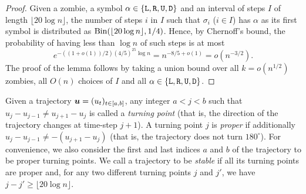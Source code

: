 \documentclass[12pt]{amsart}
\begin{document}
\begin{proof}
Given a zombie, a symbol $\alpha\in\{{\mathtt L},{\mathtt R},{\mathtt U},{\mathtt D}\}$ and an interval of steps $I$ of length $\lfloor 20\log n \rfloor$, the number of steps $i$  in $I$ such that $\sigma_i$ ($i\in I$) has $\alpha$ as its first
symbol is distributed as $\mathrm{Bin}(\lfloor 20\log n \rfloor,1/4)$. Hence, by Chernoff's bound, the probability of having less than $\log n$ of such steps is at most
\[
e^{-((1+o(1))/2)(4/5)^25\log n} = n^{-8/5+o(1)} = o(n^{-3/2}).
\]
The proof of the lemma follows by taking a union bound over all $k=o(n^{1/2})$ zombies, all $O(n)$ choices of $I$ and all $\alpha\in\{{\mathtt L},{\mathtt R},{\mathtt U},{\mathtt D}\}$.
\end{proof}
Given a trajectory ${\boldsymbol u}=(u_t)_{t\in[a,b]}$, any integer $a<j<b$ such that $u_j-u_{j-1} \ne u_{j+1}-u_j$ is called a \emph{turning point} (that is, the direction of the trajectory changes at time-step
$j+1$). A turning point $j$ is \emph{proper} if additionally $u_j-u_{j-1} \ne - (u_{j+1}-u_j)$ (that is, the trajectory does not turn $180^\circ$). For convenience, we also consider the first and last
indices $a$ and $b$ of the trajectory to be proper turning points. We call a trajectory to be \emph{stable} if all its turning points are proper and, for any two different turning points $j$ and
$j'$, we have $j-j'\ge \lfloor 20\log n \rfloor $.
\end{document}
